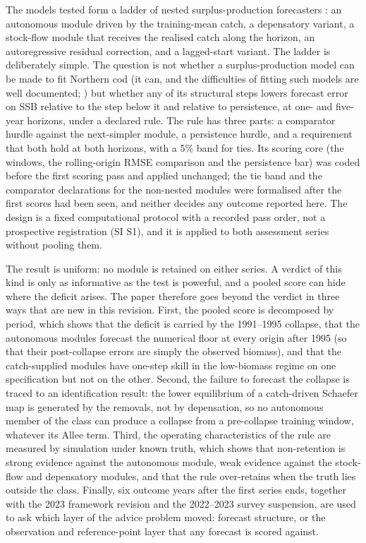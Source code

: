 The models tested form a ladder of nested surplus-production forecasters \citep{Schaefer1954,Pella1969}: an autonomous module driven by the training-mean catch, a depensatory variant, a stock-flow module that receives the realised catch along the horizon, an autoregressive residual correction, and a lagged-start variant. The ladder is deliberately simple. The question is not whether a surplus-production model can be made to fit Northern cod (it can, and the difficulties of fitting such models are well documented; \citealp{LudwigWalters1985,Polacheck1993,Punt2003,PedersenBerg2017}) but whether any of its structural steps lowers forecast error on SSB relative to the step below it and relative to persistence, at one- and five-year horizons, under a declared rule. The rule has three parts: a comparator hurdle against the next-simpler module, a persistence hurdle, and a requirement that both hold at both horizons, with a 5\% band for ties. Its scoring core (the windows, the rolling-origin RMSE comparison and the persistence bar) was coded before the first scoring pass and applied unchanged; the tie band and the comparator declarations for the non-nested modules were formalised after the first scores had been seen, and neither decides any outcome reported here. The design is a fixed computational protocol with a recorded pass order, not a prospective registration (SI S1), and it is applied to both assessment series without pooling them.

The result is uniform: no module is retained on either series. A verdict of this kind is only as informative as the test is powerful, and a pooled score can hide where the deficit arises. The paper therefore goes beyond the verdict in three ways that are new in this revision. First, the pooled score is decomposed by period, which shows that the deficit is carried by the 1991--1995 collapse, that the autonomous modules forecast the numerical floor at every origin after 1995 (so that their post-collapse errors are simply the observed biomass), and that the catch-supplied modules have one-step skill in the low-biomass regime on one specification but not on the other. Second, the failure to forecast the collapse is traced to an identification result: the lower equilibrium of a catch-driven Schaefer map is generated by the removals, not by depensation, so no autonomous member of the class can produce a collapse from a pre-collapse training window, whatever its Allee term. Third, the operating characteristics of the rule are measured by simulation under known truth, which shows that non-retention is strong evidence against the autonomous module, weak evidence against the stock-flow and depensatory modules, and that the rule over-retains when the truth lies outside the class. Finally, six outcome years after the first series ends, together with the 2023 framework revision and the 2022--2023 survey suspension, are used to ask which layer of the advice problem moved: forecast structure, or the observation and reference-point layer that any forecast is scored against.

